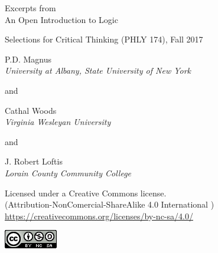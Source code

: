 \setlength{\parindent}{0em}
\thispagestyle{empty}


%


{\large Excerpts from}\\
\vfill
{\LARGE An Open Introduction to Logic}\\
\vfill 




{\large Selections for Critical Thinking (PHLY 174), Fall 2017} 


\vfill

{\sf P.D. Magnus}\\
\emph{University at Albany, State University of New York}

and

{\sf Cathal Woods}\\
\emph{Virginia Wesleyan University}

and

{\sf J. Robert Loftis}\\
\emph{Lorain County Community College}

\vfill
%
%

{\footnotesize Licensed under a Creative Commons license.\\
	(Attribution-NonComercial-ShareAlike 4.0 International )
	\url{https://creativecommons.org/licenses/by-nc-sa/4.0/}


\includegraphics[width=66pt, height=23pt, keepaspectratio=true]{img/cc-by-nc-sa.png}

}



